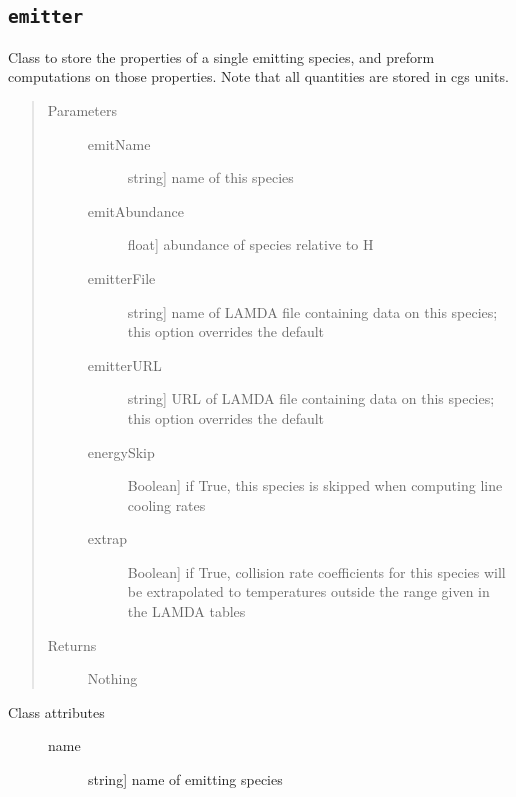 \documentclass[letterpaper,10pt,english]{sphinxmanual}
\begin{document}
\subsection{\texttt{emitter}}
\label{fulldoc:emitter}\label{fulldoc:sssec-full-emitter}

\begin{fulllineitems}
\label{fulldoc:despotic.emitter}
Class to store the properties of a single emitting species, and
preform computations on those properties. Note that all quantities
are stored in cgs units.
\begin{quote}
\begin{description}
\item[{Parameters}] \leavevmode\begin{description}
\item[{emitName}] \leavevmode{[}string{]}
name of this species

\item[{emitAbundance}] \leavevmode{[}float{]}
abundance of species relative to H

\item[{emitterFile}] \leavevmode{[}string{]}
name of LAMDA file containing data on this species; this
option overrides the default

\item[{emitterURL}] \leavevmode{[}string{]}
URL of LAMDA file containing data on this species; this
option overrides the default

\item[{energySkip}] \leavevmode{[}Boolean{]}
if True, this species is skipped when computing line
cooling rates

\item[{extrap}] \leavevmode{[}Boolean{]}
if True, collision rate coefficients for this species will
be extrapolated to temperatures outside the range given in
the LAMDA tables

\end{description}

\item[{Returns}] \leavevmode
Nothing

\end{description}
\end{quote}
\begin{description}
\item[{Class attributes}] \leavevmode\begin{description}
\item[{name}] \leavevmode{[}string{]}
name of emitting species


\end{description}
\end{description}
\end{fulllineitems}
\end{document}

